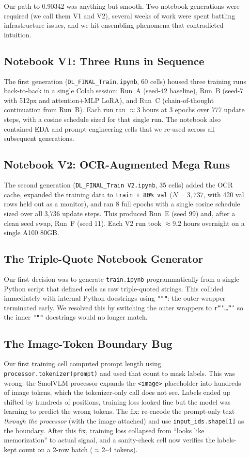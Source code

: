 \documentclass[11pt]{article}
\begin{document}
Our path to 0.90342 was anything but smooth. Two notebook generations were required (we call them V1 and V2), several weeks of work were spent battling infrastructure issues, and we hit ensembling phenomena that contradicted intuition.

\subsection{Notebook V1: Three Runs in Sequence}
The first generation (\texttt{DL\_FINAL\_Train.ipynb}, 60 cells) housed three training runs back-to-back in a single Colab session: Run~A (seed-42 baseline), Run~B (seed-7 with 512px and attention+MLP LoRA), and Run~C (chain-of-thought continuation from Run~B). Each run ran $\approx$3 hours at 3 epochs over 777 update steps, with a cosine schedule sized for that single run. The notebook also contained EDA and prompt-engineering cells that we re-used across all subsequent generations.

\subsection{Notebook V2: OCR-Augmented Mega Runs}
The second generation (\texttt{DL\_FINAL\_Train V2.ipynb}, 35 cells) added the OCR cache, expanded the training data to \texttt{train + 80\% val} ($N=3{,}737$, with 420 val rows held out as a monitor), and ran 8 full epochs with a single cosine schedule sized over all 3{,}736 update steps. This produced Run~E (seed 99) and, after a clean seed swap, Run~F (seed 11). Each V2 run took $\approx$9.2 hours overnight on a single A100 80GB.

\subsection{The Triple-Quote Notebook Generator}
Our first decision was to generate \texttt{train.ipynb} programmatically from a single Python script that defined cells as raw triple-quoted strings. This collided immediately with internal Python docstrings using \texttt{"""}: the outer wrapper terminated early. We resolved this by switching the outer wrappers to \texttt{r'''\dots'''} so the inner \texttt{"""} docstrings would no longer match.

\subsection{The Image-Token Boundary Bug}
Our first training cell computed prompt length using \texttt{processor.tokenizer(prompt)} and used that count to mask labels. This was wrong: the SmolVLM processor expands the \texttt{<image>} placeholder into hundreds of image tokens, which the tokenizer-only call does not see. Labels ended up shifted by hundreds of positions, training loss looked fine but the model was learning to predict the wrong tokens. The fix: re-encode the prompt-only text \emph{through the processor} (with the image attached) and use \texttt{input\_ids.shape[1]} as the boundary. After this fix, training loss collapsed from ``looks like memorization'' to actual signal, and a sanity-check cell now verifies the labels-kept count on a 2-row batch ($\approx$2--4 tokens).
\end{document}

